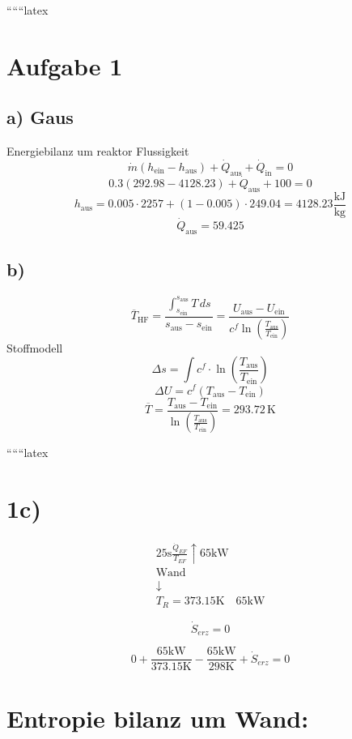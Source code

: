 
``````latex


\section*{Aufgabe 1}

\subsection*{a) Gaus}

Energiebilanz um reaktor Flussigkeit
\[
\dot{m} \left( h_{\text{ein}} - h_{\text{aus}} \right) + \dot{Q}_{\text{aus}} + \dot{Q}_{\text{in}} = 0
\]
\[
0.3 \left( 292.98 - 4128.23 \right) + \dot{Q}_{\text{aus}} + 100 = 0
\]
\[
h_{\text{aus}} = 0.005 \cdot 2257 + (1 - 0.005) \cdot 249.04 = 4128.23 \frac{\text{kJ}}{\text{kg}}
\]
\[
\dot{Q}_{\text{aus}} = 59.425
\]

\subsection*{b)}

\[
\overline{T}_{\text{HF}} = \frac{\int_{s_{\text{ein}}}^{s_{\text{aus}}} T \, ds}{s_{\text{aus}} - s_{\text{ein}}} = \frac{U_{\text{aus}} - U_{\text{ein}}}{c^f \ln \left( \frac{T_{\text{aus}}}{T_{\text{ein}}} \right)}
\]
Stoffmodell
\[
\Delta s = \int c^f \cdot \ln \left( \frac{T_{\text{aus}}}{T_{\text{ein}}} \right)
\]
\[
\Delta U = c^f \left( T_{\text{aus}} - T_{\text{ein}} \right)
\]
\[
\overline{T} = \frac{T_{\text{aus}} - T_{\text{ein}}}{\ln \left( \frac{T_{\text{aus}}}{T_{\text{ein}}} \right)} = 293.72 \, \text{K}
\]

``````latex


\section*{1c)}

\[
\begin{array}{c}
\text{25s} \frac{\dot{Q}_{EF}}{T_{EF}} \uparrow 65 \text{kW} \\
\text{Wand} \\
\downarrow \\
T_R = 373.15 \text{K} \quad 65 \text{kW}
\end{array}
\]

\[
\dot{S}_{erz} = 0
\]

\[
0 + \frac{65 \text{kW}}{373.15 \text{K}} - \frac{65 \text{kW}}{298 \text{K}} + \dot{S}_{erz} = 0
\]

\section*{Entropie bilanz um Wand:}

